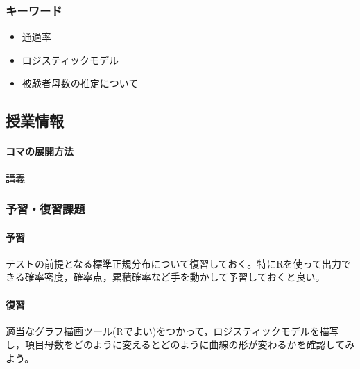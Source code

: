 \subsubsection{キーワード}
\begin{itemize}
\item 通過率
\item ロジスティックモデル
\item 被験者母数の推定について
\end{itemize}
\subsection{授業情報}
\paragraph{コマの展開方法}
講義
\subsubsection{予習・復習課題}
\paragraph{予習} テストの前提となる標準正規分布について復習しておく。特にRを使って出力できる確率密度，確率点，累積確率など手を動かして予習しておくと良い。
\paragraph{復習} 適当なグラフ描画ツール(Rでよい)をつかって，ロジスティックモデルを描写し，項目母数をどのように変えるとどのように曲線の形が変わるかを確認してみよう。
